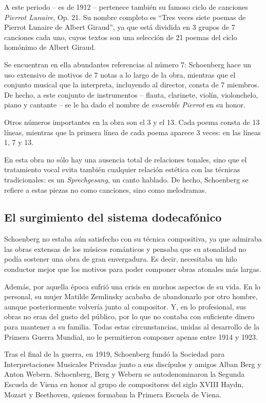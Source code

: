 		A este periodo -- es de 1912 -- pertenece tambi\'en su famoso ciclo de canciones \emph{Pierrot Lunaire}, Op. 21. Su nombre completo es ``Tres veces siete poemas de Pierrot Lunaire de Albert Giraud'', ya que est\'a dividida en 3 grupos de 7 canciones cada uno, cuyos textos son una selecci\'on de 21 poemas del ciclo hom\'onimo de Albert Giraud. 
		
		Se encuentran en ella abundantes referencias al n\'umero 7: Schoenberg hace un uso extensivo de motivos de 7 notas a lo largo de la obra, mientras que el conjunto musical que la interpreta, incluyendo al director, consta de 7 miembros. De hecho, a este conjunto de instrumentos -- flauta, clarinete, viol\'in, violonchelo, piano y cantante -- se le ha dado el nombre de \textit{ensemble Pierrot} en su honor. 
		
		Otros n\'umeros importantes en la obra son el 3 y el 13. Cada poema consta de 13 l\'ineas, mientras que la primera l\'inea de cada poema aparece 3 veces: en las l\'ineas 1, 7 y 13.
		
		En esta obra no s\'olo hay una ausencia total de relaciones tonales, sino que el tratamiento vocal evita tambi\'en cualquier relaci\'on est\'etica con las t\'ecnicas tradicionales: es un \emph{Sprechgesang}, un canto hablado. De hecho, Schoenberg se refiere a estas piezas no como canciones, sino como melodramas. \cite{diaz}
		
	\subsection{El surgimiento del sistema dodecafónico}
		Schoenberg no estaba a\'un satisfecho con su t\'ecnica compositiva, ya que admiraba las obras extensas de los m\'usicos rom\'anticos y pensaba que su atonalidad no pod\'ia sostener una obra de gran envergadura. Es decir, necesitaba un hilo conductor mejor que los motivos para poder componer obras atonales m\'as largas.
		
		Adem\'as, por aquella \'epoca sufri\'o una crisis en muchos aspectos de su vida. En lo personal, su mujer Matilde Zemlinsky acababa de abandonarlo por otro hombre, aunque posteriormente volver\'ia junto al compositor. Y, en lo profesional, sus obras no eran del gusto del p\'ublico, por lo que no contaba con suficiente dinero para mantener a su familia. Todas estas circunstancias, unidas al desarrollo de la Primera Guerra Mundial, no le permitieron componer apenas entre 1914 y 1923.
		
		Tras el final de la guerra, en 1919, Schoenberg fund\'o la Sociedad para Interpretaciones Musicales Privadas junto a sus disc\'ipulos y amigos Alban Berg y Anton Webern. Schoenberg, Berg y Webern se autodenominaron la Segunda Escuela de Viena en honor al grupo de compositores del siglo XVIII Haydn, Mozart y Beethoven, quienes formaban la Primera Escuela de Viena.%
		
